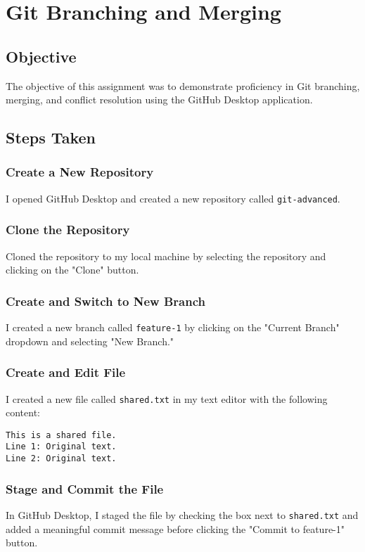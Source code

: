 \section{Git Branching and Merging}

\subsection{Objective}
The objective of this assignment was to demonstrate proficiency in Git branching, merging, and conflict resolution using the GitHub Desktop application.

\subsection{Steps Taken}

\subsubsection{Create a New Repository}
I opened GitHub Desktop and created a new repository called \texttt{git-advanced}.

\subsubsection{Clone the Repository}
Cloned the repository to my local machine by selecting the repository and clicking on the "Clone" button.

\subsubsection{Create and Switch to New Branch}
I created a new branch called \texttt{feature-1} by clicking on the "Current Branch" dropdown and selecting "New Branch."

\subsubsection{Create and Edit File}
I created a new file called \texttt{shared.txt} in my text editor with the following content:
\begin{verbatim}
This is a shared file.
Line 1: Original text.
Line 2: Original text.
\end{verbatim}

\subsubsection{Stage and Commit the File}
In GitHub Desktop, I staged the file by checking the box next to \texttt{shared.txt} and added a meaningful commit message before clicking the "Commit to feature-1" button.

